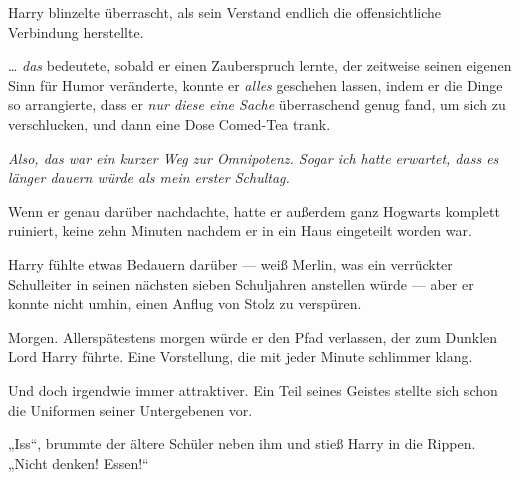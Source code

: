 Harry blinzelte überrascht, als sein Verstand endlich die offensichtliche Verbindung herstellte.

… \emph{das} bedeutete, sobald er einen Zauberspruch lernte, der zeitweise seinen eigenen Sinn für Humor veränderte, konnte er \emph{alles} geschehen lassen, indem er die Dinge so arrangierte, dass er \emph{nur diese eine Sache} überraschend genug fand, um sich zu verschlucken, und dann eine Dose Comed-Tea trank.

\emph{Also, das war ein kurzer Weg zur Omnipotenz. Sogar ich hatte erwartet, dass es länger dauern würde als mein erster Schultag.}

Wenn er genau darüber nachdachte, hatte er außerdem ganz Hogwarts komplett ruiniert, keine zehn Minuten nachdem er in ein Haus eingeteilt worden war.

Harry fühlte etwas Bedauern darüber — weiß Merlin, was ein verrückter Schulleiter in seinen nächsten sieben Schuljahren anstellen würde — aber er konnte nicht umhin, einen Anflug von Stolz zu verspüren.

Morgen. Allerspätestens morgen würde er den Pfad verlassen, der zum Dunklen Lord Harry führte. Eine Vorstellung, die mit jeder Minute schlimmer klang.

Und doch irgendwie immer attraktiver. Ein Teil seines Geistes stellte sich schon die Uniformen seiner Untergebenen vor.

„Iss“, brummte der ältere Schüler neben ihm und stieß Harry in die Rippen.
„Nicht denken! Essen!“

